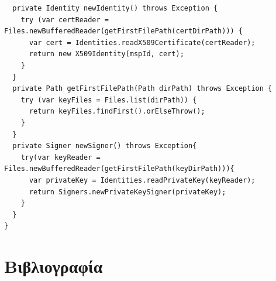 \documentclass[12pt,a4paper]{report}
\begin{document}
\begin{verbatim}
  private Identity newIdentity() throws Exception {
    try (var certReader = Files.newBufferedReader(getFirstFilePath(certDirPath))) {
      var cert = Identities.readX509Certificate(certReader);
      return new X509Identity(mspId, cert);
    }
  }
  private Path getFirstFilePath(Path dirPath) throws Exception {
    try (var keyFiles = Files.list(dirPath)) {
      return keyFiles.findFirst().orElseThrow();
    }
  }
  private Signer newSigner() throws Exception{
    try(var keyReader = Files.newBufferedReader(getFirstFilePath(keyDirPath))){
      var privateKey = Identities.readPrivateKey(keyReader);
      return Signers.newPrivateKeySigner(privateKey);
    }
  }
}
	\end{verbatim}

\chapter{Βιβλιογραφία}
\end{document}
